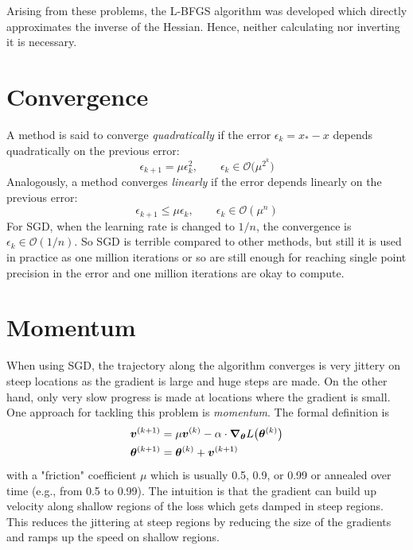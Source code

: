 		Arising from these problems, the L-BFGS algorithm was developed which directly approximates the inverse of the Hessian. Hence, neither calculating nor inverting it is necessary.

	\section{Convergence}
		A method is said to converge \emph{quadratically} if the error \( \epsilon_k = x_\ast - x \) depends quadratically on the previous error:
		\begin{equation}
			\epsilon_{k + 1} = \mu \epsilon_k^2,\qquad \epsilon_k \in \mathcal{O}\bigl(\mu^{2^k}\bigr)
		\end{equation}
		Analogously, a method converges \emph{linearly} if the error depends linearly on the previous error:
		\begin{equation}
			\epsilon_{k + 1} \leq \mu \epsilon_k,\qquad \epsilon_k \in \mathcal{O}(\mu^n)
		\end{equation}
		For SGD, when the learning rate is changed to \(1/n\), the convergence is \( \epsilon_k \in \mathcal{O}(1/n) \). So SGD is terrible compared to other methods, but still it is used in practice as one million iterations or so are still enough for reaching single point precision in the error and one million iterations are okay to compute.

	\section{Momentum}
		When using SGD, the trajectory along the algorithm converges is very jittery on steep locations as the gradient is large and huge steps are made. On the other hand, only very slow progress is made at locations where the gradient is small. One approach for tackling this problem is \emph{momentum}. The formal definition is
		\begin{align}
			\bm{v}^{(k + 1)} &= \mu \bm{v}^{(k)} - \alpha \cdot \grad_{\bm{\theta}} L\bigl(\bm{\theta}^{(k)}\bigr) \\
			\bm{\theta}^{(k + 1)} &= \bm{\theta}^{(k)} + \bm{v}^{(k + 1)}
		\end{align}
		with a "friction" coefficient \(\mu\) which is usually \num{0.5}, \num{0.9}, or \num{0.99} or annealed over time (e.g., from \num{0.5} to \num{0.99}). The intuition is that the gradient can build up velocity along shallow regions of the loss which gets damped in steep regions. This reduces the jittering at steep regions by reducing the size of the gradients and ramps up the speed on shallow regions.

